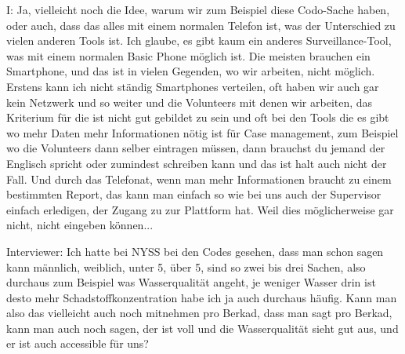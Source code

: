 I: Ja, vielleicht noch die Idee, warum wir zum Beispiel diese Codo-Sache haben, oder auch, dass das alles mit einem normalen Telefon ist, was der Unterschied zu vielen anderen Tools ist. Ich glaube, es gibt kaum ein anderes Surveillance-Tool, was mit einem normalen Basic Phone möglich ist. Die meisten brauchen ein Smartphone, und das ist in vielen Gegenden, wo wir arbeiten, nicht möglich. Erstens kann ich nicht ständig Smartphones verteilen, oft haben wir auch gar kein Netzwerk und so weiter und die Volunteers mit denen wir arbeiten, das Kriterium für die ist nicht gut gebildet zu sein und oft bei den Tools die es gibt wo mehr Daten mehr Informationen nötig ist für Case management, zum Beispiel wo die Volunteers dann selber eintragen müssen, dann brauchst du jemand der Englisch spricht oder zumindest schreiben kann und das ist halt auch nicht der Fall. Und durch das Telefonat, wenn man mehr Informationen braucht zu einem bestimmten Report, das kann man einfach so wie bei uns auch der Supervisor einfach erledigen, der Zugang zu zur Plattform hat. Weil dies möglicherweise gar nicht, nicht eingeben können... 

Interviewer: Ich hatte bei NYSS bei den Codes gesehen, dass man schon sagen kann männlich, weiblich, unter 5, über 5, sind so zwei bis drei Sachen, also durchaus zum Beispiel was Wasserqualität angeht, je weniger Wasser drin ist desto mehr Schadstoffkonzentration habe ich ja auch durchaus häufig. Kann man also das vielleicht auch noch mitnehmen pro Berkad, dass man sagt pro Berkad, kann man auch noch sagen, der ist voll und die Wasserqualität sieht gut aus, und er ist auch accessible für uns? 

